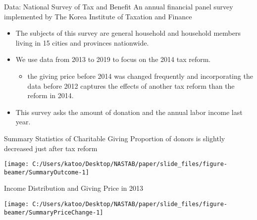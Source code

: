 \documentclass[
  ignorenonframetext,
  aspectratio=169,
]{beamer}
\providecommand{\tightlist}{%
  \setlength{\itemsep}{0pt}\setlength{\parskip}{0pt}}
\begin{document}
\begin{frame}{Data: National Survey of Tax and Benefit}
\protect\hypertarget{data-national-survey-of-tax-and-benefit}{}
An annual financial panel survey implemented by The Korea Institute of Taxation and Finance

\begin{itemize}
\tightlist
\item
  The subjects of this survey are general household and household members living in 15 cities and provinces nationwide.
\item
  We use data from 2013 to 2019 to focus on the 2014 tax reform.

  \begin{itemize}
  \tightlist
  \item
    the giving price before 2014 was changed frequently and incorporating the data before 2012 captures the effects of another tax reform than the reform in 2014.
  \end{itemize}
\item
  This survey asks the amount of donation and the annual labor income last year.
\end{itemize}
\end{frame}

\begin{frame}{Summary Statistics of Charitable Giving}
\protect\hypertarget{summary-statistics-of-charitable-giving}{}
Proportion of donors is slightly decreased just after tax reform

\begin{center}\texttt{[image: C:/Users/katoo/Desktop/NASTAB/paper/slide\_files/figure-beamer/SummaryOutcome-1]} \end{center}
\end{frame}

\begin{frame}{Income Distribution and Giving Price in 2013}
\protect\hypertarget{income-distribution-and-giving-price-in-2013}{}
\begin{center}\texttt{[image: C:/Users/katoo/Desktop/NASTAB/paper/slide\_files/figure-beamer/SummaryPriceChange-1]} \end{center}
\end{frame}
\end{document}
